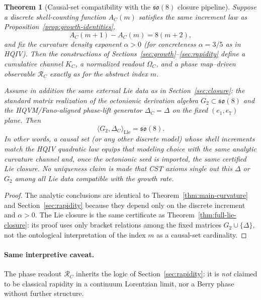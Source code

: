 \documentclass[11pt]{amsart}
\newtheorem{theorem}{Theorem}[section]
\begin{document}
\begin{theorem}[Causal-set compatibility with the \(\mathfrak{so}(8)\) closure pipeline]
\label{thm:cst-so8}
Suppose a discrete shell-counting function \(A_C(m)\) satisfies the same increment law as Proposition~\ref{prop:growth-identities},
\[
A_C(m+1)-A_C(m)=8(m+2),
\]
and fix the curvature density exponent \(\alpha>0\) (for concreteness \(\alpha=3/5\) as in HQIV). Then the constructions of Sections~\ref{sec:growth}--\ref{sec:rapidity} define a cumulative channel \(K_C\), a normalized readout \(\Omega_C\), and a phase map--driven observable \(\mathcal{R}_C\) exactly as for the abstract index \(m\).

Assume in addition the \emph{same external Lie data} as in Section~\ref{sec:closure}: the standard matrix realization of the octonionic derivation algebra \(G_2\subset\mathfrak{so}(8)\) and the HQVM/Fano-aligned phase-lift generator \(\Delta_C=\Delta\) on the fixed \((e_1,e_7)\) plane. Then
\[
\langle G_2,\Delta_C\rangle_{\mathrm{Lie}}=\mathfrak{so}(8).
\]
In other words, a causal set (or any other discrete model) whose shell increments match the HQIV quadratic law \emph{equips that modeling choice} with the same analytic curvature channel and, once the octonionic seed is imported, the same certified Lie closure. No uniqueness claim is made that CST axioms single out this \(\Delta\) or \(G_2\) among all Lie data compatible with the growth rate.
\end{theorem}

\begin{proof}
The analytic conclusions are identical to Theorem~\ref{thm:main-curvature} and Section~\ref{sec:rapidity} because they depend only on the discrete increment and \(\alpha>0\). The Lie closure is the same certificate as Theorem~\ref{thm:full-lie-closure}: its proof uses only bracket relations among the fixed matrices \(G_2\cup\{\Delta\}\), not the ontological interpretation of the index \(m\) as a causal-set cardinality.
\end{proof}

\paragraph{Same interpretive caveat.}
The phase readout \(\mathcal{R}_C\) inherits the logic of Section~\ref{sec:rapidity}: it is \emph{not} claimed to be classical rapidity in a continuum Lorentzian limit, nor a Berry phase without further structure.
\end{document}
